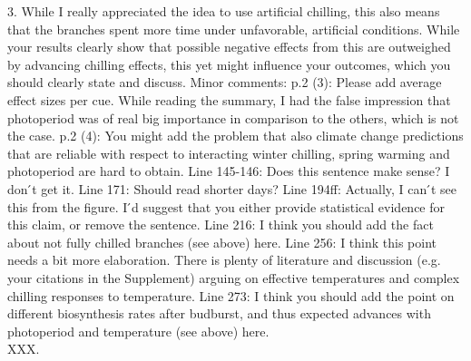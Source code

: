 \documentclass[11pt,a4paper]{article}
\begin{document}
{3.      While I really appreciated the idea to use artificial chilling, this also means that
the branches spent more time under unfavorable, artificial conditions. While your results
clearly show that possible negative effects from this are outweighed by advancing chilling
effects, this yet might influence your outcomes, which you should clearly state and discuss.
Minor comments:
p.2 (3): Please add average effect sizes per cue. While reading the summary, I had the false
impression that photoperiod was of real big importance in comparison to the others, which is
not the case.
p.2 (4): You might add the problem that also climate change predictions that are reliable
with respect to interacting winter chilling, spring warming and photoperiod are hard to
obtain.
Line 145-146: Does this sentence make sense? I don ́t get it.
Line 171: Should read shorter days?
Line 194ff: Actually, I can ́t see this from the figure. I ́d suggest that you either provide
statistical evidence for this claim, or remove the sentence.
Line 216: I think you should add the fact about not fully chilled branches (see above) here.
Line 256: I think this point needs a bit more elaboration. There is plenty of literature and
discussion (e.g. your citations in the Supplement) arguing on effective temperatures and
complex chilling responses to temperature.
Line 273: I think you should add the point on different biosynthesis rates after budburst,
and thus expected advances with photoperiod and temperature (see above) here.}\\

XXX. \\

\newpage

\end{document}
